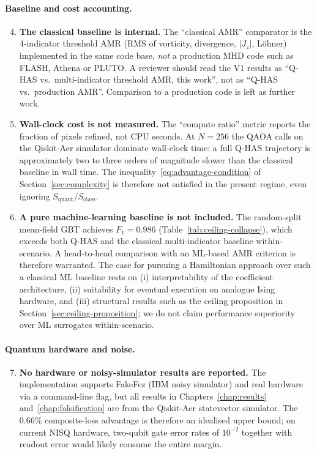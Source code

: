 \documentclass[12pt, a4paper, oneside]{report}
\begin{document}
\paragraph{Baseline and cost accounting.}
\begin{enumerate}
    \setcounter{enumi}{3}
    \item \textbf{The classical baseline is internal.} The ``classical AMR'' comparator is the 4-indicator threshold AMR (RMS of vorticity, divergence, $|J_z|$, L\"ohner) implemented in the same code base, \emph{not} a production MHD code such as FLASH, Athena or PLUTO. A reviewer should read the V1 results as ``Q-HAS vs.\ multi-indicator threshold AMR, this work'', not as ``Q-HAS vs.\ production AMR''. Comparison to a production code is left as further work.
    \item \textbf{Wall-clock cost is not measured.} The ``compute ratio'' metric reports the fraction of pixels refined, not CPU seconds. At $N = 256$ the QAOA calls on the Qiskit-Aer simulator dominate wall-clock time: a full Q-HAS trajectory is approximately two to three orders of magnitude slower than the classical baseline in wall time. The inequality~\eqref{eq:advantage-condition} of Section~\ref{sec:complexity} is therefore not satisfied in the present regime, even ignoring $S_{\text{quant}}/S_{\text{class}}$.
    \item \textbf{A pure machine-learning baseline is not included.} The random-split mean-field GBT achieves $F_1 = 0.986$ (Table~\ref{tab:ceiling-collapse}), which exceeds both Q-HAS and the classical multi-indicator baseline within-scenario. A head-to-head comparison with an ML-based AMR criterion is therefore warranted. The case for pursuing a Hamiltonian approach over such a classical ML baseline rests on (i) interpretability of the coefficient architecture, (ii) suitability for eventual execution on analogue Ising hardware, and (iii) structural results such as the ceiling proposition in Section~\ref{sec:ceiling-proposition}; we do not claim performance superiority over ML surrogates within-scenario.
\end{enumerate}

\paragraph{Quantum hardware and noise.}
\begin{enumerate}
    \setcounter{enumi}{6}
    \item \textbf{No hardware or noisy-simulator results are reported.} The implementation supports FakeFez (IBM noisy simulator) and real hardware via a command-line flag, but all results in Chapters~\ref{chap:results} and~\ref{chap:falsification} are from the Qiskit-Aer statevector simulator. The $0.66\%$ composite-loss advantage is therefore an idealised upper bound; on current NISQ hardware, two-qubit gate error rates of $10^{-2}$ together with readout error would likely consume the entire margin.
\end{enumerate}
\end{document}
